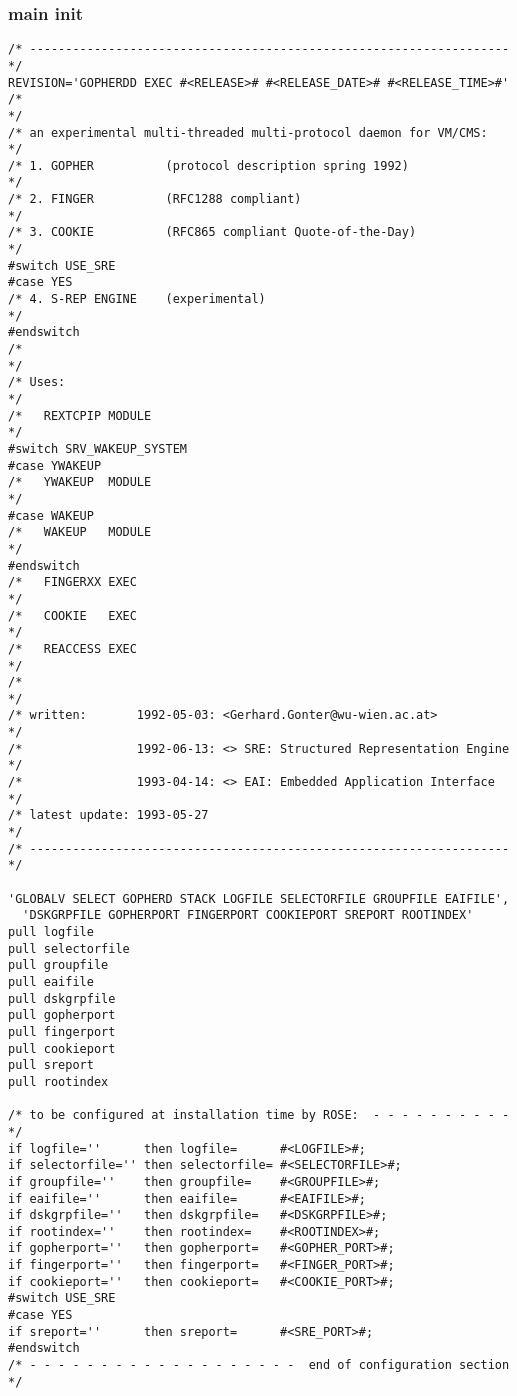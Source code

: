 \subsubsection{main init}

\def\LPtopF{main init}

\begin{verbatim}
/* ------------------------------------------------------------------- */
REVISION='GOPHERDD EXEC #<RELEASE># #<RELEASE_DATE># #<RELEASE_TIME>#'
/*                                                                     */
/* an experimental multi-threaded multi-protocol daemon for VM/CMS:    */
/* 1. GOPHER          (protocol description spring 1992)               */
/* 2. FINGER          (RFC1288 compliant)                              */
/* 3. COOKIE          (RFC865 compliant Quote-of-the-Day)              */
#switch USE_SRE
#case YES
/* 4. S-REP ENGINE    (experimental)                                   */
#endswitch
/*                                                                     */
/* Uses:                                                               */
/*   REXTCPIP MODULE                                                   */
#switch SRV_WAKEUP_SYSTEM
#case YWAKEUP
/*   YWAKEUP  MODULE                                                   */
#case WAKEUP
/*   WAKEUP   MODULE                                                   */
#endswitch
/*   FINGERXX EXEC                                                     */
/*   COOKIE   EXEC                                                     */
/*   REACCESS EXEC                                                     */
/*                                                                     */
/* written:       1992-05-03: <Gerhard.Gonter@wu-wien.ac.at>           */
/*                1992-06-13: <> SRE: Structured Representation Engine */
/*                1993-04-14: <> EAI: Embedded Application Interface   */
/* latest update: 1993-05-27                                           */
/* ------------------------------------------------------------------- */

'GLOBALV SELECT GOPHERD STACK LOGFILE SELECTORFILE GROUPFILE EAIFILE',
  'DSKGRPFILE GOPHERPORT FINGERPORT COOKIEPORT SREPORT ROOTINDEX'
pull logfile
pull selectorfile
pull groupfile
pull eaifile
pull dskgrpfile
pull gopherport
pull fingerport
pull cookieport
pull sreport
pull rootindex

/* to be configured at installation time by ROSE:  - - - - - - - - - - */
if logfile=''      then logfile=      #<LOGFILE>#;
if selectorfile='' then selectorfile= #<SELECTORFILE>#;
if groupfile=''    then groupfile=    #<GROUPFILE>#;
if eaifile=''      then eaifile=      #<EAIFILE>#;
if dskgrpfile=''   then dskgrpfile=   #<DSKGRPFILE>#;
if rootindex=''    then rootindex=    #<ROOTINDEX>#;
if gopherport=''   then gopherport=   #<GOPHER_PORT>#;
if fingerport=''   then fingerport=   #<FINGER_PORT>#;
if cookieport=''   then cookieport=   #<COOKIE_PORT>#;
#switch USE_SRE
#case YES
if sreport=''      then sreport=      #<SRE_PORT>#;
#endswitch
/* - - - - - - - - - - - - - - - - - - -  end of configuration section */


\end{verbatim}
